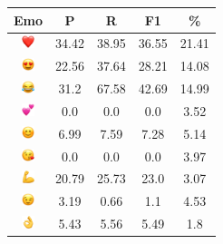 \documentclass{article}
\begin{document}
\begin{table}
\centering
\begin{tabular}{|c|ccc|c|} \hline
\textbf{Emo} & \textbf{P} & \textbf{R} & \textbf{F1} & \textbf{\%} \\ \hline
\includegraphics[height=0.37cm,width=0.37cm]{img/red_heart.png} & 34.42 & 38.95 & 36.55 & 21.41\\ 
\includegraphics[height=0.37cm,width=0.37cm]{img/smiling_face_with_hearteyes.png} & 22.56 & 37.64 & 28.21 & 14.08\\ 
\includegraphics[height=0.37cm,width=0.37cm]{img/face_with_tears_of_joy.png} & 31.2 & 67.58 & 42.69 & 14.99\\ 
\includegraphics[height=0.37cm,width=0.37cm]{img/two_hearts.png} & 0.0 & 0.0 & 0.0 & 3.52\\ 
\includegraphics[height=0.37cm,width=0.37cm]{img/smiling_face_with_smiling_eyes.png} & 6.99 & 7.59 & 7.28 & 5.14\\ 
\includegraphics[height=0.37cm,width=0.37cm]{img/face_blowing_a_kiss.png} & 0.0 & 0.0 & 0.0 & 3.97\\ 
\includegraphics[height=0.37cm,width=0.37cm]{img/flexed_biceps.png} & 20.79 & 25.73 & 23.0 & 3.07\\ 
\includegraphics[height=0.37cm,width=0.37cm]{img/winking_face.png} & 3.19 & 0.66 & 1.1 & 4.53\\ 
\includegraphics[height=0.37cm,width=0.37cm]{img/OK_hand.png} & 5.43 & 5.56 & 5.49 & 1.8\\ 

\end{tabular}
\end{table}
\end{document}
